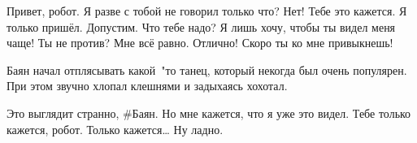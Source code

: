 \begin{dialog}
\X Привет, робот.
\R Я разве с тобой не говорил только что?
\X Нет! Тебе это кажется. Я только пришёл.
\R Допустим. Что тебе надо?
\X Я лишь хочу, чтобы ты видел меня чаще! Ты не против?
\R Мне всё равно.
\X Отлично! Скоро ты ко мне привыкнешь!
\end{dialog}

\begin{monolog}
Баян начал отплясывать какой~"то танец, который некогда был очень популярен. При этом звучно хлопал клешнями и задыхаясь хохотал. 
\end{monolog}

\begin{dialog}
\X Это выглядит странно, \#Баян. Но мне кажется, что я уже это видел.
\R Тебе только кажется, робот. Только кажется…
\X Ну ладно.
\end{dialog}